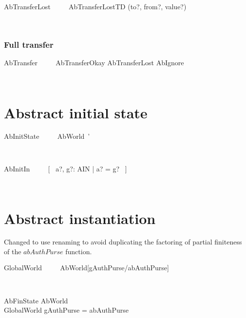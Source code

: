 \begin{LSDef}
\begin{zed}
   AbTransferLost ~~~~ AbTransferLostTD \hide (to?, from?, value?)
\end{zed}~\end{LSDef}

\subsubsection{Full transfer}

\begin{LSDef}
\begin{zed}
   AbTransfer ~~~~ AbTransferOkay \lor AbTransferLost \lor AbIgnore
\end{zed}~\end{LSDef}

\section{Abstract initial state}

\begin{LSDef}
\begin{zed}
  AbInitState ~~~~ AbWorld~'
\end{zed}~\end{LSDef}

\begin{LSDef}
\begin{zed}
  AbInitIn ~~~~ [~ a?, g?: AIN | a? = g? ~]
\end{zed}~\end{LSDef}

\section{Abstract instantiation}

Changed to use renaming to avoid duplicating the
factoring of partial finiteness of the $abAuthPurse$
function.
%
\begin{LSDef}
\begin{zed}
   GlobalWorld ~~~~ AbWorld[gAuthPurse/abAuthPurse]
\end{zed}~\end{LSDef}

\begin{LSDef}
\begin{schema}{AbFinState}
   AbWorld \\
   GlobalWorld
\where
   gAuthPurse = abAuthPurse
\end{schema}~\end{LSDef}

